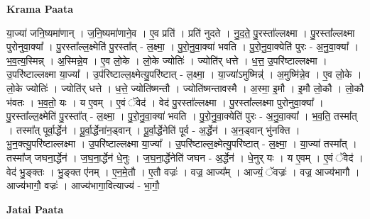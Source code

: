 \documentclass[17pt]{extarticle}
\begin{document}
\textbf{Krama Paata} \newline

या॒ज्या॑ जनि॒ष्यमा॑णान् । ज॒नि॒ष्यमा॑णाने॒व । ए॒व प्रति॑ । प्रति॑ नुदते । नु॒द॒ते॒ पु॒रस्ता᳚ल्लक्ष्मा । पु॒रस्ता᳚ल्लक्ष्मा पुरोनुवा॒क्या᳚ । पु॒रस्ता᳚ल्ल॒क्ष्मेति॑ पु॒रस्ता᳚त् - ल॒क्ष्मा॒ । पु॒रो॒नु॒वा॒क्या॑ भवति । पु॒रो॒नु॒वा॒क्येति॑ पुरः - अ॒नु॒वा॒क्या᳚ । भ॒व॒त्य॒स्मिन्न् । अ॒स्मिन्ने॒व । ए॒व लो॒के । लो॒के ज्योतिः॑ । ज्योति॑र् धत्ते । ध॒त्त॒ उ॒परि॑ष्टाल्लक्ष्मा । उ॒परि॑ष्टाल्लक्ष्मा या॒ज्या᳚ । उ॒प॑रिष्टाल्ल॒क्ष्मेत्यु॒परि॑ष्टात् - ल॒क्ष्मा॒ । या॒ज्या॑ऽमुष्मिन्न्॑ । अ॒मुष्मि॑न्ने॒व । ए॒व लो॒के । लो॒के ज्योतिः॑ । ज्योति॑र् धत्ते । ध॒त्ते॒ ज्योति॑ष्मन्तौ । ज्योति॑ष्मन्तावस्मै । अ॒स्मा॒ इ॒मौ । इ॒मौ लो॒कौ । लो॒कौ भ॑वतः । भ॒व॒तो॒ यः । य ए॒वम् । ए॒वं ॅवेद॑ । वेद॑ पु॒रस्ता᳚ल्लक्ष्मा । पु॒रस्ता᳚ल्लक्ष्मा पुरोनुवा॒क्या᳚ । पु॒रस्ता᳚ल्ल॒क्ष्मेति॑ पु॒रस्ता᳚त् - ल॒क्ष्मा॒ । पु॒रो॒नु॒वा॒क्या॑ भवति । पु॒रो॒नु॒वा॒क्येति॑ पुरः - अ॒नु॒वा॒क्या᳚ । भ॒व॒ति॒ तस्मा᳚त् । तस्मा᳚त् पूर्वा॒र्द्धेन॑ । पू॒र्वा॒र्द्धेना॑न॒ड्वान् । पू॒र्वा॒र्द्धेनेति॑ पूर्व - अ॒र्द्धेन॑ । अ॒न॒ड्वान् भु॑नक्ति । भु॒न॒क्त्यु॒परि॑ष्टाल्लक्ष्मा । उ॒परि॑ष्टाल्लक्ष्मा या॒ज्या᳚ । उ॒परि॑ष्टाल्ल॒क्ष्मेत्यु॒परि॑ष्टात् - ल॒क्ष्मा॒ । या॒ज्या॑ तस्मा᳚त् । तस्मा᳚ज् जघना॒र्द्धेन॑ । ज॒घ॒ना॒र्द्धेन॑ धे॒नुः । ज॒घ॒ना॒र्द्धेनेति॑ जघन - अ॒र्द्धेन॑ । धे॒नुर् यः । य ए॒वम् । ए॒वं ॅवेद॑ । वेद॑ भु॒ङ्क्तः । भु॒ङ्क्त ए॑नम् । ए॒न॒मे॒तौ । ए॒तौ वज्रः॑ । वज्र॒ आज्य᳚म् । आज्यं॒ ॅवज्रः॑ । वज्र॒ आज्य॑भागौ । आज्य॑भागौ॒ वज्रः॑ । आज्य॑भागा॒वित्याज्य॑ - भा॒गौ॒ \newline

\textbf{Jatai Paata} \newline
\end{document}
